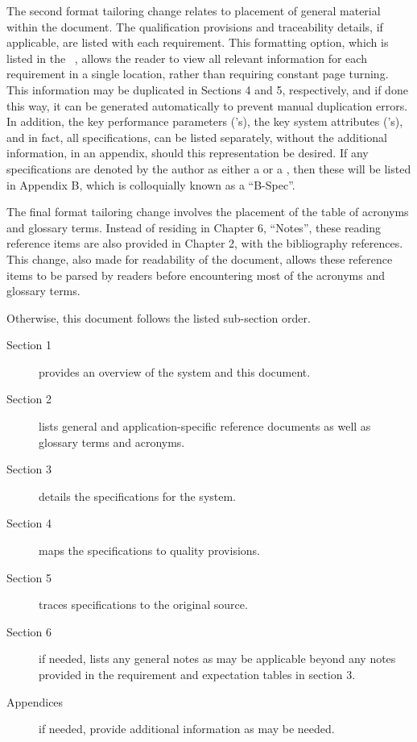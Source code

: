 The second format tailoring change relates to placement of general material within the document. 
The qualification provisions and traceability details, if applicable, are listed with each requirement.
This formatting option, which is listed in the \SSS \DID~\cite{ref__SSS_DID}, allows the reader to view all relevant information for each requirement in a single location, rather than requiring constant page turning.
This information may be duplicated in Sections 4 and 5, respectively, and if done this way, it can be generated automatically to prevent manual duplication errors.
In addition, the key performance parameters (\KPP's), the key system attributes (\KSA's), and in fact, all specifications, can be listed separately, without the additional information, in an appendix, should this representation be desired.
If any specifications are denoted by the author as either a \KPP or a \KSA, then these will be listed in Appendix B, which is colloquially known as a ``B-Spec''.

The final format tailoring change involves the placement of the table of acronyms and glossary terms.
Instead of residing in Chapter 6, ``Notes'', these reading reference items are also provided in Chapter 2, with the bibliography references.
This change, also made for readability of the document, allows these reference items to be parsed by readers before encountering most of the acronyms and glossary terms.

Otherwise, this document follows the listed \SSS sub-section order.
\begin{description}
	\item[Section 1] provides an overview of the system and this document.
	\item[Section 2] lists general and application-specific reference documents as well as glossary terms and acronyms. 
	\item[Section 3] details the specifications for the system.
	\item[Section 4] maps the specifications to quality provisions. 
	\item[Section 5] traces specifications to the original source.
	\item[Section 6] if needed, lists any general notes as may be applicable beyond any notes provided in the requirement and expectation tables in section 3.
	\item[Appendices] if needed, provide additional information as may be needed.
\end{description}